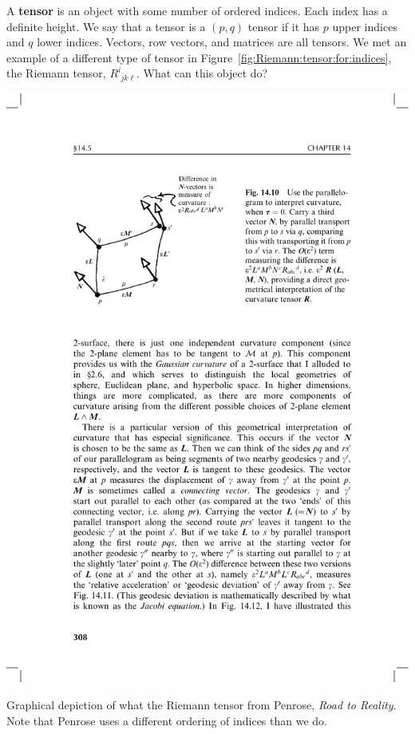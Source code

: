 A \textbf{tensor} is an object with some number of ordered indices. Each index has a definite height. We say that a tensor is a $(p,q)$ tensor if it has $p$ upper indices and $q$ lower indices. Vectors, row vectors, and matrices are all tensors. We met an example of a different type of tensor in Figure~\ref{fig:Riemann:tensor:for:indices}, the Riemann tensor, $R^i_{\phantom{i}jk\ell}$. What can this object do? 
\begin{marginfigure}%
    \includegraphics[width=.8\textwidth]{figures/Penrose_Riemann_14_10.pdf}
    \caption{Graphical depiction of what the Riemann tensor from Penrose, \emph{Road to Reality}. Note that Penrose uses a different ordering of indices than we do.}
    \label{fig:Penrose:14:10:Riemann}
\end{marginfigure}
